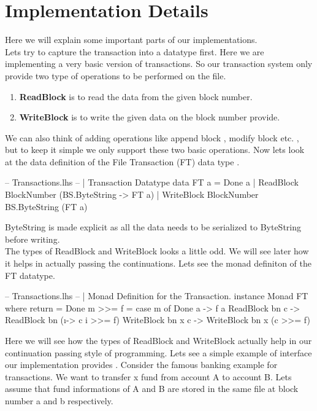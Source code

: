 \documentclass[11pt,a4paper]{article}
\begin{document}
\pagebreak
\section{Implementation Details}
Here we will explain some important parts of our implementations. \\
Lets try to capture the transaction into a datatype first. Here
we are implementing a very basic version of transactions. So our
transaction system only provide two type of operations to be performed
on the file.
\begin{enumerate}
\item \textbf{ReadBlock} is to read the data from the given block number.
\item \textbf{WriteBlock} is to write the given data on the block number provide.
\end{enumerate}
We can also think of adding operations like append block , modify block
etc. , but to keep it simple we only support these two basic operations.
Now lets look at the data definition of the File Transaction (FT) data
type . \\
\begin{code}[name=Transactions]
-- Transactions.lhs
-- | Transaction Datatype
data FT a = 
    Done a | 
    ReadBlock BlockNumber (BS.ByteString -> FT a) | 
    WriteBlock BlockNumber BS.ByteString (FT a)
\end{code}
ByteString is made explicit as all the data needs to be serialized to ByteString before writing.\\
The types of ReadBlock and WriteBlock looks a little odd. We will see later how it helps in actually passing the continuations.
Lets see the monad definiton of the FT datatype. \\
\begin{code}[name=Transactions]
-- Transactions.lhs
-- | Monad Definition for the Transaction. 
instance Monad FT where 
    return = Done 
    m >>= f = case m of 
        Done a -> f a 
        ReadBlock bn c -> ReadBlock bn (\i -> c i  >>= f) 
        WriteBlock bn x c -> WriteBlock bn x (c >>= f)
\end{code}
Here we will see how the types of ReadBlock and WriteBlock actually help
in our continuation passing style of programming. Lets see a simple
example of interface our implementation provides .
Consider the famous banking example for transactions. We want to
transfer x fund from account A to account B.
Lets assume that fund informations of A and B are stored in the same
file at block number a and b respectively.
\end{document}

